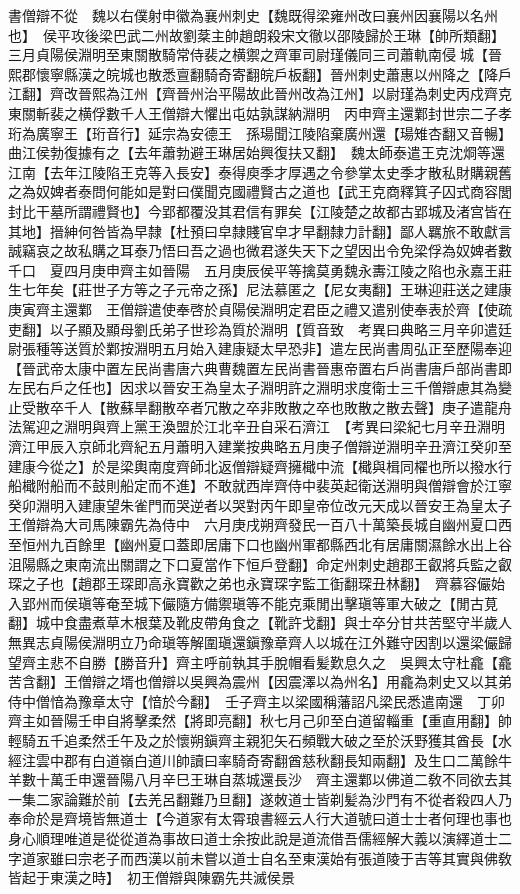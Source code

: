 書僧辯不從　魏以右僕射申徽為襄州刺史【魏既得梁雍州改曰襄州因襄陽以名州也】　侯平攻後梁巴武二州故劉棻主帥趙朗殺宋文徹以邵陵歸於王琳【帥所類翻】　三月貞陽侯淵明至東關散騎常侍裴之横禦之齊軍司尉瑾儀同三司蕭軌南侵城【晉熙郡懷寧縣漢之皖城也散悉亶翻騎奇寄翻皖戶板翻】晉州刺史蕭惠以州降之【降戶江翻】齊改晉熙為江州【齊晉州治平陽故此晉州改為江州】以尉瑾為刺史丙戍齊克東關斬裴之横俘數千人王僧辯大懼出屯姑孰謀納淵明　丙申齊主還鄴封世宗二子孝珩為廣寧王【珩音行】延宗為安德王　孫瑒聞江陵陷棄廣州還【瑒雉杏翻又音暢】曲江侯勃復據有之【去年蕭勃避王琳居始興復扶又翻】　魏太師泰遣王克沈烱等還江南【去年江陵陷王克等入長安】泰得庾季才厚遇之令參掌太史季才散私財購親舊之為奴婢者泰問何能如是對曰僕聞克國禮賢古之道也【武王克商釋箕子囚式商容閭封比干墓所謂禮賢也】今郢都覆没其君信有罪矣【江陵楚之故都古郢城及渚宫皆在其地】搢紳何咎皆為早隸【杜預曰皁隸賤官皁才早翻隸力計翻】鄙人羈旅不敢獻言誠竊哀之故私購之耳泰乃悟曰吾之過也微君遂失天下之望因出令免梁俘為奴婢者數千口　夏四月庚申齊主如晉陽　五月庚辰侯平等擒莫勇魏永夀江陵之陷也永嘉王莊生七年矣【莊世子方等之子元帝之孫】尼法慕匿之【尼女夷翻】王琳迎莊送之建康　庚寅齊主還鄴　王僧辯遣使奉啓於貞陽侯淵明定君臣之禮又遣别使奉表於齊【使疏吏翻】以子顯及顯母劉氏弟子世珍為質於淵明【質音致　考異曰典略三月辛卯遣廷尉張種等送質於鄴按淵明五月始入建康疑太早恐非】遣左民尚書周弘正至歷陽奉迎【晉武帝太康中置左民尚書唐六典曹魏置左民尚書晉惠帝置右戶尚書唐戶部尚書即左民右戶之任也】因求以晉安王為皇太子淵明許之淵明求度衛士三千僧辯慮其為變止受散卒千人【散蘇旱翻散卒者冗散之卒非敗散之卒也敗散之散去聲】庚子遣龍舟法駕迎之淵明與齊上黨王渙盟於江北辛丑自采石濟江　【考異曰梁紀七月辛丑淵明濟江甲辰入京師北齊紀五月蕭明入建業按典略五月庚子僧辯逆淵明辛丑濟江癸卯至建康今從之】於是梁輿南度齊師北返僧辯疑齊擁檝中流【檝與楫同櫂也所以撥水行船檝附船而不鼓則船定而不進】不敢就西岸齊侍中裴英起衛送淵明與僧辯會於江寧癸卯淵明入建康望朱雀門而哭逆者以哭對丙午即皇帝位改元天成以晉安王為皇太子王僧辯為大司馬陳霸先為侍中　六月庚戌朔齊發民一百八十萬築長城自幽州夏口西至恒州九百餘里【幽州夏口蓋即居庸下口也幽州軍都縣西北有居庸關濕餘水出上谷沮陽縣之東南流出關謂之下口夏當作下恒戶登翻】命定州刺史趙郡王叡將兵監之叡琛之子也【趙郡王琛即高永寶歡之弟也永寶琛字監工衘翻琛丑林翻】　齊慕容儼始入郢州而侯瑱等奄至城下儼隨方備禦瑱等不能克乘閒出擊瑱等軍大破之【閒古莧翻】城中食盡煮草木根葉及靴皮帶角食之【靴許戈翻】與士卒分甘共苦堅守半歲人無異志貞陽侯淵明立乃命瑱等解圍瑱還鎭豫章齊人以城在江外難守因割以還梁儼歸望齊主悲不自勝【勝音升】齊主呼前執其手脫帽看髪歎息久之　吳興太守杜龕【龕苦含翻】王僧辯之壻也僧辯以吳興為震州【因震澤以為州名】用龕為刺史又以其弟侍中僧愔為豫章太守【愔於今翻】　壬子齊主以梁國稱藩詔凡梁民悉遣南還　丁卯齊主如晉陽壬申自將擊柔然【將即亮翻】秋七月己卯至白道留輜重【重直用翻】帥輕騎五千追柔然壬午及之於懷朔鎭齊主親犯矢石頻戰大破之至於沃野獲其酋長【水經注雲中郡有白道嶺白道川帥讀曰率騎奇寄翻酋慈秋翻長知兩翻】及生口二萬餘牛羊數十萬壬申還晉陽八月辛巳王琳自蒸城還長沙　齊主還鄴以佛道二敎不同欲去其一集二家論難於前【去羌呂翻難乃旦翻】遂敇道士皆剃髪為沙門有不從者殺四人乃奉命於是齊境皆無道士【今道家有太霄琅書經云人行大道號曰道士士者何理也事也身心順理唯道是從從道為事故曰道士余按此說是道流借吾儒經解大義以演繹道士二字道家雖曰宗老子而西漢以前未嘗以道士自名至東漢始有張道陵于吉等其實與佛敎皆起于東漢之時】　初王僧辯與陳霸先共滅侯景